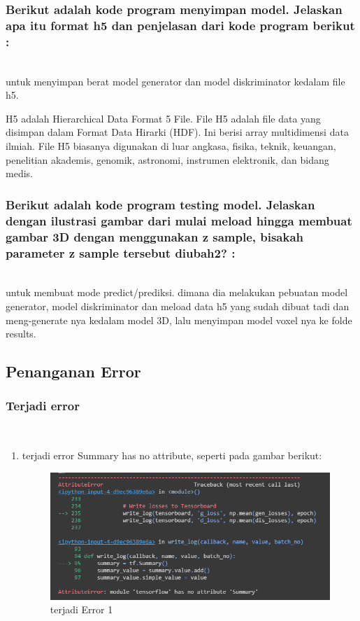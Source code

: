 \subsubsection{Berikut adalah kode program menyimpan model. Jelaskan apa itu format h5 dan penjelasan dari kode program berikut :}
\hfill\\

untuk menyimpan berat model generator dan model diskriminator kedalam file h5.

H5 adalah Hierarchical Data Format 5 File.
File H5 adalah file data yang disimpan dalam Format Data Hirarki (HDF). Ini berisi array multidimensi data ilmiah. File H5 biasanya digunakan di luar angkasa, fisika, teknik, keuangan, penelitian akademis, genomik, astronomi, instrumen elektronik, dan bidang medis.

\subsubsection{Berikut adalah kode program testing model. Jelaskan dengan ilustrasi gambar dari mulai meload hingga membuat gambar 3D dengan menggunakan z sample, bisakah parameter z sample tersebut diubah2? :}
\hfill\\

untuk membuat mode predict/prediksi. dimana dia melakukan pebuatan model generator, model diskriminator dan meload data h5 yang sudah dibuat tadi dan meng-generate nya kedalam model 3D, lalu menyimpan model voxel nya ke folde results.

\subsection{Penanganan Error}
\subsubsection{Terjadi error}
\hfill\\
\begin{enumerate}
\item terjadi error Summary has no attribute, seperti pada gambar berikut:
\begin{figure}[H]
	\centering
	\includegraphics[scale=0.5]{figures/1174083/figures8/error1.png}
	\caption{terjadi Error 1}
\end{figure}
\end{enumerate}

